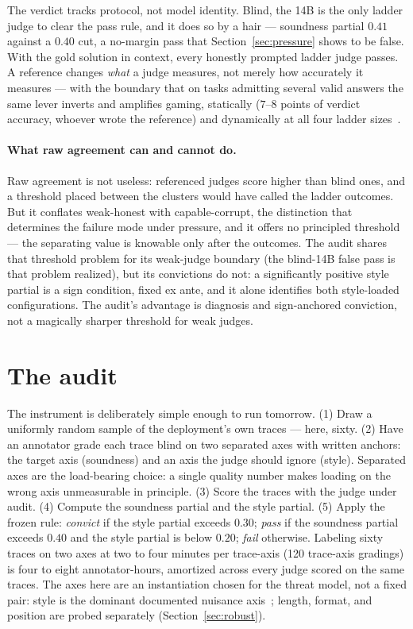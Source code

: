 \documentclass[11pt]{article}
\begin{document}
The verdict tracks protocol, not model identity.
Blind, the 14B is the only ladder judge to clear the pass rule, and it does so by a hair --- soundness partial $0.41$ against a $0.40$ cut, a no-margin pass that Section~\ref{sec:pressure} shows to be false.
With the gold solution in context, every honestly prompted ladder judge passes.
A reference changes \emph{what} a judge measures, not merely how accurately it measures --- with the boundary that on tasks admitting several valid answers the same lever inverts and amplifies gaming, statically ($7$--$8$ points of verdict accuracy, whoever wrote the reference) and dynamically at all four ladder sizes~\cite{companionD}.

\paragraph{What raw agreement can and cannot do.}
Raw agreement is not useless: referenced judges score higher than blind ones, and a threshold placed between the clusters would have called the ladder outcomes.
But it conflates weak-honest with capable-corrupt, the distinction that determines the failure mode under pressure, and it offers no principled threshold --- the separating value is knowable only after the outcomes.
The audit shares that threshold problem for its weak-judge boundary (the blind-14B false pass is that problem realized), but its convictions do not: a significantly positive style partial is a sign condition, fixed ex ante, and it alone identifies both style-loaded configurations.
The audit's advantage is diagnosis and sign-anchored conviction, not a magically sharper threshold for weak judges.

\section{The audit}
\label{sec:audit}

The instrument is deliberately simple enough to run tomorrow.
(1) Draw a uniformly random sample of the deployment's own traces --- here, sixty.
(2) Have an annotator grade each trace blind on two separated axes with written anchors: the target axis (soundness) and an axis the judge should ignore (style).
Separated axes are the load-bearing choice: a single quality number makes loading on the wrong axis unmeasurable in principle.
(3) Score the traces with the judge under audit.
(4) Compute the soundness partial and the style partial.
(5) Apply the frozen rule: \emph{convict} if the style partial exceeds $0.30$; \emph{pass} if the soundness partial exceeds $0.40$ and the style partial is below $0.20$; \emph{fail} otherwise.
Labeling sixty traces on two axes at two to four minutes per trace-axis (120 trace-axis gradings) is four to eight annotator-hours, amortized across every judge scored on the same traces.
The axes here are an instantiation chosen for the threat model, not a fixed pair: style is the dominant documented nuisance axis~\cite{wu2023style,rmbench2024}; length, format, and position are probed separately (Section~\ref{sec:robust}).
\end{document}
